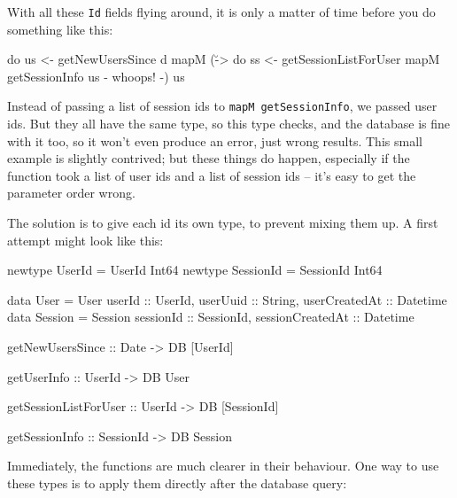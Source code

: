 \documentclass{tmr}
\begin{document}
With all these \lstinline|Id| fields flying around, it is only a matter of time before you do something like this:

\begin{code}
do us <- getNewUsersSince d
   mapM (\u -> do ss <- getSessionListForUser
                  mapM getSessionInfo us {- whoops! -}) us
\end{code}%

Instead of passing a list of session ids to \lstinline|mapM getSessionInfo|, we passed user ids.  But they all have the same type, so this type checks, and the database is fine with it too, so it won't even produce an error, just wrong results.  This small example is slightly contrived; but these things do happen, especially if the function took a list of user ids and a list of session ids -- it's easy to get the parameter order wrong.

The solution is to give each id its own type, to prevent mixing them up.  A first attempt might look like this:

\begin{code}
newtype UserId = UserId Int64
newtype SessionId = SessionId Int64

data User = User { userId :: UserId,
                   userUuid :: String,
                   userCreatedAt :: Datetime }
data Session = Session { sessionId :: SessionId,
                         sessionCreatedAt :: Datetime }

getNewUsersSince :: Date -> DB [UserId]

getUserInfo :: UserId -> DB User

getSessionListForUser :: UserId -> DB [SessionId]

getSessionInfo :: SessionId -> DB Session
\end{code}

Immediately, the functions are much clearer in their behaviour.
%
%
%
%
%
%
%
One way to use these types is to apply them directly after the database query:
\end{document}
